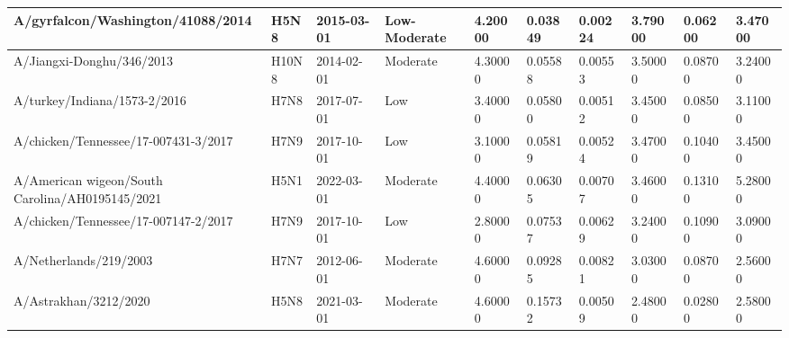 \begin{tabular}{L{1in}|L{1in}|L{1in}|L{1in}|L{1in}|L{1in}|L{1in}|L{1in}|L{1in}|L{1in}}
 A/gyrfalcon/Washington/41088/2014 &H5N8&2015-03-01& Low-Moderate &4.20000&0.03849&0.00224&3.79000&0.06200&3.47000\\\hline
 A/Jiangxi-Donghu/346/2013 &H10N8&2014-02-01& Moderate &4.30000&0.05588&0.00553&3.50000&0.08700&3.24000\\\hline
 A/turkey/Indiana/1573-2/2016 &H7N8&2017-07-01&Low&3.40000&0.05800&0.00512&3.45000&0.08500&3.11000\\\hline
 A/chicken/Tennessee/17-007431-3/2017 &H7N9&2017-10-01&Low&3.10000&0.05819&0.00524&3.47000&0.10400&3.45000\\\hline
 A/American  wigeon/South  Carolina/AH0195145/2021 &H5N1&2022-03-01& Moderate &4.40000&0.06305&0.00707&3.46000&0.13100&5.28000\\\hline
 A/chicken/Tennessee/17-007147-2/2017 &H7N9&2017-10-01&Low&2.80000&0.07537&0.00629&3.24000&0.10900&3.09000\\\hline
 A/Netherlands/219/2003 &H7N7&2012-06-01& Moderate &4.60000&0.09285&0.00821&3.03000&0.08700&2.56000\\\hline
 A/Astrakhan/3212/2020 &H5N8&2021-03-01& Moderate &4.60000&0.15732&0.00509&2.48000&0.02800&2.58000\\\hline
\hline\end{tabular}
